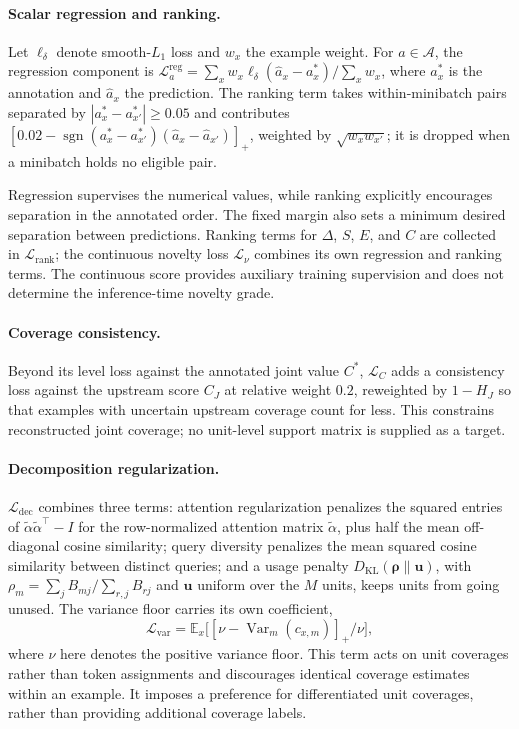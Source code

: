 \paragraph{Scalar regression and ranking.}
Let $\ell_\delta$ denote smooth-$L_1$ loss and $w_x$ the example weight. For
$a\in\mathcal{A}$, the regression component is
$\mathcal{L}^{\mathrm{reg}}_a=\sum_xw_x\ell_\delta(\widehat a_x-a^*_x)/\sum_xw_x$, where
$a^*_x$ is the annotation and $\widehat a_x$ the prediction. The ranking term
takes within-minibatch pairs separated by $|a^*_x-a^*_{x'}|\geq0.05$ and
contributes
$[0.02-\operatorname{sgn}(a^*_x-a^*_{x'})(\widehat a_x-\widehat a_{x'})]_+$,
weighted by $\sqrt{w_xw_{x'}}$; it is dropped when a minibatch holds no
eligible pair.

Regression supervises the numerical values, while ranking explicitly
encourages separation in the annotated order. The fixed margin also sets a
minimum desired separation between predictions. Ranking terms for $\Delta$,
$S$, $E$, and $C$ are collected in $\mathcal{L}_{\mathrm{rank}}$; the
continuous novelty loss $\mathcal{L}_{\nu}$ combines its own regression and
ranking terms. The continuous score provides auxiliary training supervision
and does not determine the inference-time novelty grade.

\paragraph{Coverage consistency.}
Beyond its level loss against the annotated joint value $C^*$,
$\mathcal{L}_{C}$ adds a consistency loss against the upstream score $C_J$ at
relative weight $0.2$, reweighted by $1-H_J$ so that examples with uncertain
upstream coverage count for less. This constrains reconstructed joint coverage;
no unit-level support matrix is supplied as a target.

\paragraph{Decomposition regularization.}
$\mathcal{L}_{\mathrm{dec}}$ combines three terms: attention
regularization penalizes the squared entries of
$\widetilde\alpha\widetilde\alpha^\top-I$ for the row-normalized attention
matrix $\widetilde\alpha$, plus half the mean off-diagonal cosine similarity;
query diversity penalizes the mean squared cosine similarity between distinct
queries; and a usage penalty
$D_{\mathrm{KL}}(\boldsymbol{\rho}\|\boldsymbol{u})$, with
$\rho_m=\sum_jB_{mj}/\sum_{r,j}B_{rj}$ and $\boldsymbol{u}$ uniform over the
$M$ units, keeps units from going unused. The variance floor carries its own
coefficient,
\begin{equation}
 \mathcal{L}_{\mathrm{var}}
 =\mathbb{E}_x\bigl[[\nu-\operatorname{Var}_m(c_{x,m})]_+/\nu\bigr],
\end{equation}
where $\nu$ here denotes the positive variance floor. This term acts on unit
coverages rather than token assignments and discourages identical coverage
estimates within an example. It imposes a preference for differentiated unit
coverages, rather than providing additional coverage labels.

